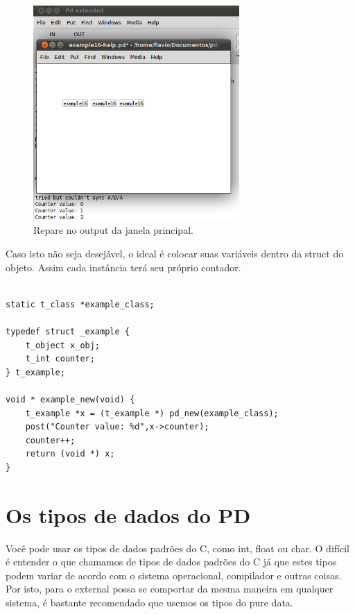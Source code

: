 \documentclass[10pt,a4paper]{report}
\begin{document}
\begin{figure}[h!]
	\centering
	\includegraphics[width=0.7\textwidth]{example16}
	\caption{Repare no output da janela principal.}
\end{figure}

Caso isto não seja desejável, o ideal é colocar suas variáveis dentro da struct do objeto. Assim cada instância terá seu próprio contador.

\begin{lstlisting}

static t_class *example_class;

typedef struct _example {
    t_object x_obj;
    t_int counter;
} t_example;

void * example_new(void) {
    t_example *x = (t_example *) pd_new(example_class);
    post("Counter value: %d",x->counter);
    counter++;
    return (void *) x;
}

\end{lstlisting}


\chapter{Os tipos de dados do PD}

Você pode usar os tipos de dados padrões do C, como int, float ou char. O difícil é entender o que chamamos de tipos de dados padrões do C já que estes tipos podem variar de acordo com o sistema operacional, compilador e outras coisas. Por isto, para o external possa se comportar da mesma maneira em qualquer sistema, é bastante recomendado que usemos os tipos do pure data.
\end{document}
